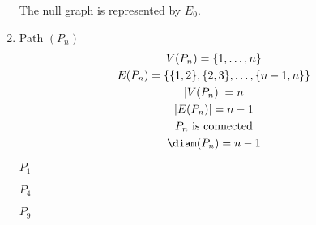 \documentclass[letterpaper,12pt,fleqn]{article}
\begin{document}
\begin{enumerate}[left=0pt]
  The null graph is represented by \(E_0\).

  \bigskip

\item Path \((P_n)\)
  \begin{gather*}
    V(P_n)=\set{1,\ldots,n} \\
    E(P_n)=\set{\set{1,2},\set{2,3},\ldots,\set{n-1,n}} \\
    \abs{V(P_n)}=n \\
    \abs{E(P_n)}=n-1 \\
    P_n\ \text{is connected} \\
    \diam(P_n)=n-1
  \end{gather*}

  \begin{examples}
    \begin{minipage}{1.5in}
      \begin{center}

        \bigskip

        \(P_1\)
      \end{center}
    \end{minipage}
    \begin{minipage}{2.5in}
      \begin{center}

        \bigskip

        \(P_4\)
      \end{center}
    \end{minipage}
    \begin{minipage}{2in}
      \begin{center}

        \bigskip

        \(P_9\)
      \end{center}
    \end{minipage}
  \end{examples}


\end{enumerate}
\end{document}
